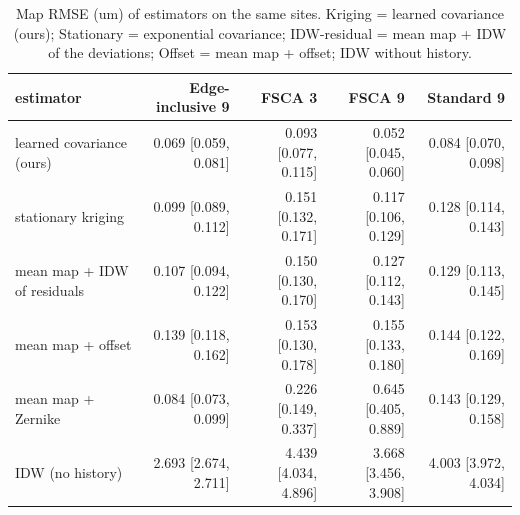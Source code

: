 \begin{table}[t]
\centering
\caption{Map RMSE (um) of estimators on the same sites. Kriging = learned covariance (ours); Stationary = exponential covariance; IDW-residual = mean map + IDW of the deviations; Offset = mean map + offset; IDW without history.}
\label{tab:estimators}
\footnotesize
\begin{tabular}{lrrrr}
\toprule
estimator & Edge-inclusive 9 & FSCA 3 & FSCA 9 & Standard 9 \\
\midrule
learned covariance (ours) & 0.069 [0.059, 0.081] & 0.093 [0.077, 0.115] & 0.052 [0.045, 0.060] & 0.084 [0.070, 0.098] \\
stationary kriging & 0.099 [0.089, 0.112] & 0.151 [0.132, 0.171] & 0.117 [0.106, 0.129] & 0.128 [0.114, 0.143] \\
mean map + IDW of residuals & 0.107 [0.094, 0.122] & 0.150 [0.130, 0.170] & 0.127 [0.112, 0.143] & 0.129 [0.113, 0.145] \\
mean map + offset & 0.139 [0.118, 0.162] & 0.153 [0.130, 0.178] & 0.155 [0.133, 0.180] & 0.144 [0.122, 0.169] \\
mean map + Zernike & 0.084 [0.073, 0.099] & 0.226 [0.149, 0.337] & 0.645 [0.405, 0.889] & 0.143 [0.129, 0.158] \\
IDW (no history) & 2.693 [2.674, 2.711] & 4.439 [4.034, 4.896] & 3.668 [3.456, 3.908] & 4.003 [3.972, 4.034] \\
\bottomrule
\end{tabular}
\end{table}
